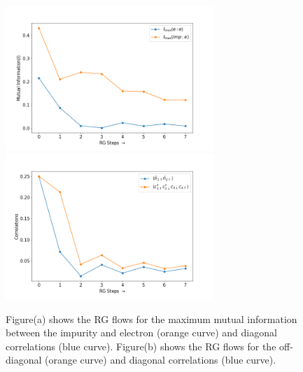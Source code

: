 \documentclass[aps,prb,preprint,groupedaddress]{revtex4-2}
\begin{document}
\begin{figure}
\includegraphics[width=0.7\textwidth]{MIkondo.png}
\includegraphics[width=0.7\textwidth]{corrKondo.png}
\caption{Figure(a) shows the RG flows for the maximum mutual information between the impurity and electron (orange curve) and diagonal correlations (blue curve). Figure(b) shows the RG flows for the off-diagonal (orange curve) and diagonal correlations (blue curve).}\label{MI1}
\end{figure}
\end{document}
